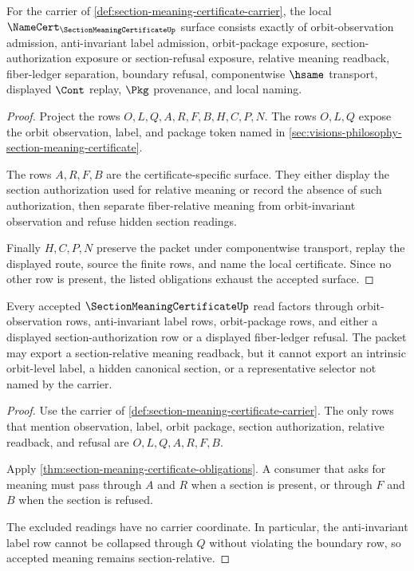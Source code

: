 \begin{theorem}
\label{thm:section-meaning-certificate-obligations}
For the carrier of \autoref{def:section-meaning-certificate-carrier}, the local $\NameCert_{\SectionMeaningCertificateUp}$ surface consists exactly of orbit-observation admission, anti-invariant label admission, orbit-package exposure, section-authorization exposure or section-refusal exposure, relative meaning readback, fiber-ledger separation, boundary refusal, componentwise $\hsame$ transport, displayed $\Cont$ replay, $\Pkg$ provenance, and local naming.
\end{theorem}
\begin{proof}
Project the rows $O,L,Q,A,R,F,B,H,C,P,N$. The rows $O,L,Q$ expose the orbit observation, label, and package token named in \autoref{sec:visions-philosophy-section-meaning-certificate}.

The rows $A,R,F,B$ are the certificate-specific surface. They either display the section authorization used for relative meaning or record the absence of such authorization, then separate fiber-relative meaning from orbit-invariant observation and refuse hidden section readings.

Finally $H,C,P,N$ preserve the packet under componentwise transport, replay the displayed route, source the finite rows, and name the local certificate. Since no other row is present, the listed obligations exhaust the accepted surface.
\end{proof}

\begin{theorem}
\label{thm:section-meaning-certificate-boundary}
Every accepted $\SectionMeaningCertificateUp$ read factors through orbit-observation rows, anti-invariant label rows, orbit-package rows, and either a displayed section-authorization row or a displayed fiber-ledger refusal. The packet may export a section-relative meaning readback, but it cannot export an intrinsic orbit-level label, a hidden canonical section, or a representative selector not named by the carrier.
\end{theorem}
\begin{proof}
Use the carrier of \autoref{def:section-meaning-certificate-carrier}. The only rows that mention observation, label, orbit package, section authorization, relative readback, and refusal are $O,L,Q,A,R,F,B$.

Apply \autoref{thm:section-meaning-certificate-obligations}. A consumer that asks for meaning must pass through $A$ and $R$ when a section is present, or through $F$ and $B$ when the section is refused.

The excluded readings have no carrier coordinate. In particular, the anti-invariant label row cannot be collapsed through $Q$ without violating the boundary row, so accepted meaning remains section-relative.
\end{proof}

